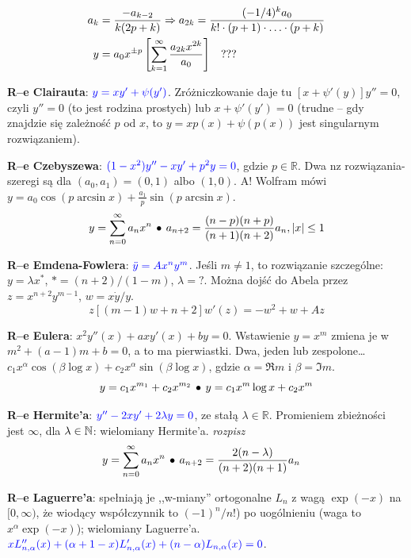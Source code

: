 \begin{multicols}{2}
\begin{enumx}
\begin{align*}
	a_k & = \frac{-a_{k-2}}{k(2p+k)} \Rightarrow
	a_{2k} = \frac{(-1/4)^ka_0}{k! \cdot (p+1) \cdot \ldots \cdot (p+k)} \\ 
	y & = a_0x^{\pm p} \left[\sum_{k=1}^\infty \frac{a_{2k}x^{2k}}{a_0}\right] \quad ???
\end{align*}
\item \textbf{R--e Clairauta}: $\color{blue} y = x y' + \psi (y')$.
Zróżniczkowanie daje tu $[x + \psi'(y)] y'' = 0$, czyli $y'' = 0$ (to jest rodzina prostych) lub $x + \psi'(y') = 0$ (trudne -- gdy znajdzie się zależność $p$ od $x$, to $y = xp(x) + \psi(p(x))$ jest singularnym rozwiązaniem).
\item \textbf{R--e Czebyszewa}: $\color{blue}(1-x^2) y'' - xy' + p^2y=0$, gdzie $p \in \mathbb R$.
Dwa nz rozwiązania-szeregi  są dla $(a_0,a_1) = (0,1)$ albo $(1,0)$.
A!
Wolfram mówi $y = a_0 \cos(p \arcsin x) + \frac{a_1}{p} \sin(p \arcsin x)$.
\[
	y = \sum_{n=0}^\infty a_n x^n \, \bullet \,
	a_{n+2} = \frac{(n-p)(n+p)}{(n+1)(n+2)} a_n, |x| \le 1 
\]
\item \textbf{R--e Emdena-Fowlera}: $\color{blue}\ddot y = A x^ny^m$.
Jeśli $m \neq 1$, to rozwiązanie szczególne: $y = \lambda x^{*}$, $* = (n+2) / (1-m)$, $\lambda = ?$.
Można dojść do Abela przez $z = x^{n+2}y^{m-1}$, $w = x \dot y / y$.
$$
	z [(m-1)w + n+2]w'(z) = -w^2 + w + Az
$$
\item \textbf{R--e Eulera}: $x^2 y''(x) + ax y'(x) + by = 0$.
Wstawienie $y = x^m$ zmiena je w $m^2 + (a-1)m +b=0$, a to ma pierwiastki.
Dwa, jeden lub zespolone\dots $c_1 x^\alpha \cos(\beta \log x) + c_2 x^\alpha \sin(\beta \log x)$, gdzie $\alpha = \Re m$ i $\beta = \Im m$.
\[
	y = c_1x^{m_1} + c_2 x^{m_2} \, \bullet \,
	y = c_1x^m \log x+ c_2 x^m
\]
\item \textbf{R--e Hermite'a}: $\color{blue}  y'' - 2x y' + 2\lambda y = 0$, ze stałą $\lambda \in \mathbb R$.
Promieniem zbieżności jest $\infty$, dla $\lambda \in \mathbb N$: wielomiany Hermite'a. \hfill \emph{rozpisz }
\begin{align*}
	y & = \sum_{n=0}^\infty a_n x^n \, \bullet \,
	a_{n+2} = \frac{2(n-\lambda)}{(n+2)(n+1)} a_n
\end{align*}
\item \textbf{R--e Laguerre'a}: spełniają je ,,w-miany'' ortogonalne $L_n$ z  wagą $\exp(-x)$ na $[0, \infty)$, że wiodący współczynnik to $(-1)^n/n!$) po uogólnieniu (waga to $x^\alpha \exp(-x)$); wielomiany Laguerre'a.\hfill\\
$\color{blue} x L_{n, \alpha}''(x) + (\alpha + 1 - x) L_{n, \alpha}'(x) + (n-\alpha) L_{n, \alpha} (x) = 0$.

\end{enumx}
\end{multicols}
